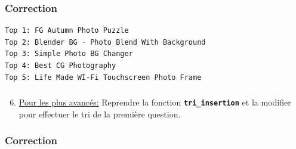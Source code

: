 \documentclass[svgnames,11pt]{beamer}
\begin{document}
\begin{frame}[fragile]
    \frametitle{Correction}


\begin{center}
    \begin{lstlisting}[language=bash]
Top 1: FG Autumn Photo Puzzle
Top 2: Blender BG - Photo Blend With Background
Top 3: Simple Photo BG Changer
Top 4: Best CG Photography
Top 5: Life Made WI-Fi Touchscreen Photo Frame
    \end{lstlisting}
    \end{center}


\end{frame}

\begin{frame}
    \frametitle{}
\setcounter{compteuractivite}{5}
    \begin{activite}
        \begin{enumerate}
            \setcounter{enumi}{5}
            \item \underline{Pour les plus avancés:} Reprendre la fonction \textbf{\texttt{tri\_insertion}} et la modifier pour effectuer le tri de la première question.
        \end{enumerate}
    \end{activite}

\end{frame}
\begin{frame}
    \frametitle{Correction}

    

\end{frame}
\end{document}
